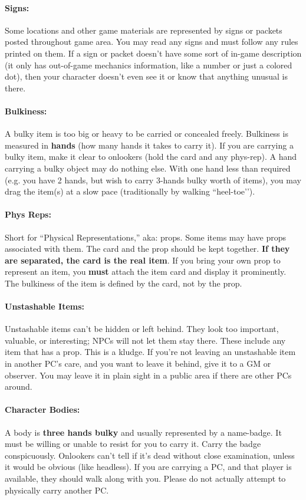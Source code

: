 \documentclass[sheet]{GL2020}
\begin{document}
\paragraph{Signs:} Some locations and other game materials are represented by signs or packets posted throughout game area. You may read any signs and must follow any rules printed on them. If a sign or packet doesn't have some sort of in-game description (it only has out-of-game mechanics information, like a number or just a colored dot), then your character doesn't even see it or know that anything unusual is there.

\paragraph{Bulkiness:} A bulky item is too big or heavy to be carried or concealed freely.  Bulkiness is measured in {\bf hands} (how many hands it takes to carry it).  If you are carrying a bulky item, make it clear to onlookers (hold the card and any phys-rep).  A hand carrying a bulky object may do nothing else.  With one hand less than required (e.g. you have 2 hands, but wish to carry 3-hands bulky worth of items), you may drag the item(s) at a slow pace (traditionally by walking ``heel-toe’’).

\paragraph{Phys Reps:} Short for ``Physical Representations,'' aka: props. Some items may have props associated with them.  The card and the prop should be kept together. \textbf{If they are separated, the card is the real item}. If you bring your own prop to represent an item, you \textbf{must} attach the item card and display it prominently. The bulkiness of the item is defined by the card, not by the prop.

\paragraph{Unstashable Items:} Unstashable items can't be hidden or left behind. They look too important, valuable, or interesting; NPCs will not let them stay there. These include any item that has a prop. This is a kludge. If you're not leaving an unstashable item in another PC's care, and you want to leave it behind, give it to a GM or observer. You may leave it in plain sight in a public area if there are other PCs around.

\paragraph{Character Bodies:} A body is {\bf three hands bulky} and usually represented by a name-badge.  It must be willing or unable to resist for you to carry it.  Carry the badge conspicuously. Onlookers can't tell if it's dead without close examination, unless it would be obvious (like headless). If you are carrying a PC, and that player is available, they should walk along with you. Please do not actually attempt to physically carry another PC.
\end{document}

